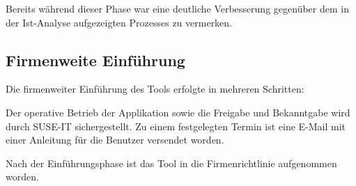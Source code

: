 Bereits während dieser Phase war eine deutliche Verbesserung gegenüber dem in der Ist-Analyse
aufgezeigten Prozesses zu vermerken.

\subsection{Firmenweite Einführung}
\label{Firmenweite Einführung}
Die firmenweiter Einführung des Tools erfolgte in mehreren Schritten:

Der operative Betrieb der Applikation sowie die Freigabe und Bekanntgabe wird durch SUSE-IT
sichergestellt.
Zu einem festgelegten Termin ist eine E-Mail mit einer Anleitung für die Benutzer versendet worden.

Nach der Einführungsphase ist das Tool in die Firmenrichtlinie 
aufgenommen worden.
\pagebreak
